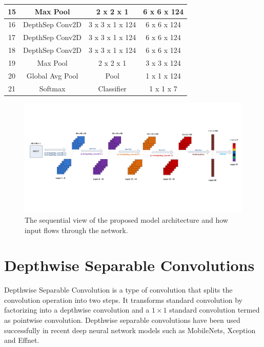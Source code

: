 \documentclass[master]{thesis-uestc}
\begin{document}
\begin{table}[ht]
\begin{center}
\begin{tabular}{|c|c|c|c|}
15 & Max Pool & 2 x 2 x 1 & 6 x 6 x 124\\ \hline

16 & DepthSep Conv2D & 3 x 3 x 1 x 124 & 6 x 6 x 124\\ \hline
17 & DepthSep Conv2D & 3 x 3 x 1 x 124 & 6 x 6 x 124\\ \hline
18 & DepthSep Conv2D & 3 x 3 x 1 x 124 & 6 x 6 x 124\\ \hline

19 & Max Pool & 2 x 2 x 1 & 3 x 3 x 124\\ \hline

20 & Global Avg Pool & Pool & 1 x 1 x 124\\ \hline
21 & Softmax & Classifier & 1 x 1 x 7\\ \hline

\end{tabular}
\end{center}
\end{table}

\begin{figure}[ht]
\includegraphics[width=6in]{pic/sequence_model_architecture.pdf}
\caption{The sequential view of the proposed model architecture and how input flows through the network.}
\label{sequence_model_arch}
\end{figure}

\section{Depthwise Separable Convolutions}\label{depthconve}
Depthwise Separable Convolution is a type of convolution that splits the convolution operation into two steps. It transforms standard convolution by factorizing into a depthwise convolution and a $1 \times 1$ standard convolution termed as pointwise convolution. Depthwise separable convolutions have been used successfully in recent deep neural network models such as MobileNets, Xception and Effnet.
\end{document}
